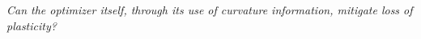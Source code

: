 \documentclass{article}
\begin{document}
\begin{center}
\emph{Can the optimizer itself, through its use of curvature information, mitigate loss 
of plasticity?}
\end{center}


\end{document}

